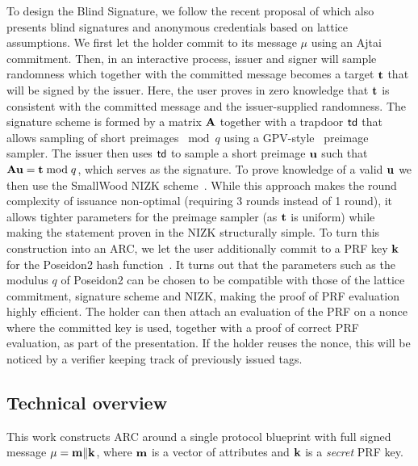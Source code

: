 To design the Blind Signature, we follow the recent proposal of \cite{C:BLNS23,CCS:LyuSeiSte24,PKC:DKLW25} which also presents blind signatures and anonymous credentials based on lattice assumptions. We first let the holder commit to its message $\mu$ using an Ajtai commitment. Then, in an interactive process, issuer and signer will sample randomness which together with the committed message becomes  a target \(\mathbf{t}\)  that will be signed by the issuer. Here, the user proves in zero knowledge that \(\mathbf{t}\) is consistent with the committed message and the issuer-supplied randomness. The signature scheme is formed by a matrix $\mathbf{A}$ together with a trapdoor $\mathsf{td}$ that allows sampling of short preimages $\bmod q$ using a GPV-style~\cite{STOC:GenPeiVai08} preimage sampler.
	The issuer then uses $\mathsf{td}$ to sample a short preimage \(\mathbf{u}\) such that \(\mathbf{A} \mathbf{u}=\mathbf{t} \bmod q\), which serves as the signature. To prove knowledge of a valid $\mathbf{u}$ we then use the SmallWood NIZK scheme~\cite{EPRINT:FenRiv25b}. While this approach makes the round complexity of issuance non-optimal (requiring 3 rounds instead of 1 round), it allows tighter parameters for the preimage sampler (as $\mathbf{t}$ is uniform) while making the statement proven in the NIZK structurally simple. To turn this construction into an ARC, we let the user additionally commit to a PRF key $\mathbf{k}$ for the Poseidon2 hash function~\cite{AFRICACRYPT:GraKhoSch23}. It turns out that the parameters such as the modulus $q$ of Poseidon2 can be chosen to be compatible with those of the lattice commitment, signature scheme and NIZK, making the proof of PRF evaluation highly efficient. The holder can then attach an evaluation of the PRF on a nonce where the committed key is used, together with a proof of correct PRF evaluation, as part of the presentation. If the holder reuses the nonce, this will be noticed by a verifier keeping track of previously issued tags.



\subsection{Technical overview}

This work constructs ARC around a single protocol blueprint with full signed message
\(\mathbf{\mu}=\mathbf{m}\Vert \mathbf{k}\), where \(\mathbf{m}\) is a vector of attributes and \(\mathbf{k}\) is a \emph{secret} PRF key.

